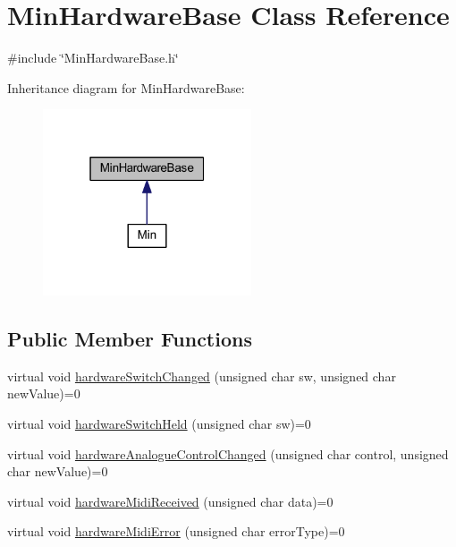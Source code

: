 \hypertarget{class_min_hardware_base}{}\section{Min\+Hardware\+Base Class Reference}
\label{class_min_hardware_base}


{\ttfamily \#include \char`\"{}Min\+Hardware\+Base.\+h\char`\"{}}



Inheritance diagram for Min\+Hardware\+Base\+:
\nopagebreak
\begin{figure}[H]
\begin{center}
\leavevmode
\includegraphics[width=175pt]{class_min_hardware_base__inherit__graph}
\end{center}
\end{figure}
\subsection*{Public Member Functions}
\begin{DoxyCompactItemize}
\item 
virtual void \hyperlink{class_min_hardware_base_a782fcaa265c084be39b509bd289dc42f}{hardware\+Switch\+Changed} (unsigned char sw, unsigned char new\+Value)=0
\item 
virtual void \hyperlink{class_min_hardware_base_a9e05f7b18377441b61457ded9a57f088}{hardware\+Switch\+Held} (unsigned char sw)=0
\item 
virtual void \hyperlink{class_min_hardware_base_a68f71adaa4f8ed5d170fa09820f63871}{hardware\+Analogue\+Control\+Changed} (unsigned char control, unsigned char new\+Value)=0
\item 
virtual void \hyperlink{class_min_hardware_base_a8dc8c84b39b7b80d4a3c7e7fce017f2a}{hardware\+Midi\+Received} (unsigned char data)=0
\item 
virtual void \hyperlink{class_min_hardware_base_ab65fc29881bb7dea6273c0753ad5d7dd}{hardware\+Midi\+Error} (unsigned char error\+Type)=0
\end{DoxyCompactItemize}


